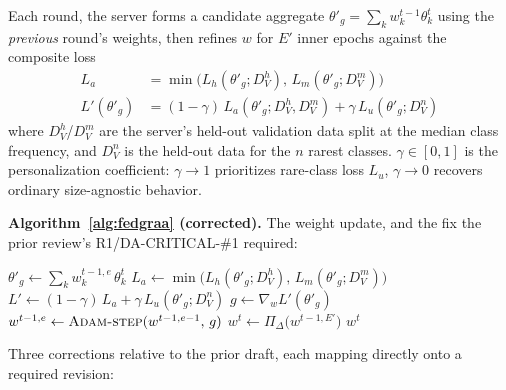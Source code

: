 \documentclass{llncs}
\begin{document}
Each round, the server forms a candidate aggregate $\theta'_g = \sum_k w_k^{t-1} \theta_k^t$ using the \emph{previous} round's weights, then refines $w$ for $E'$ inner epochs against the composite loss
\begin{align}
L_a &= \min\big(L_h(\theta'_g; D_V^h),\, L_m(\theta'_g; D_V^m)\big) \label{eq:la}\\
L'(\theta'_g) &= (1-\gamma)\, L_a(\theta'_g; D_V^h, D_V^m) + \gamma\, L_u(\theta'_g; D_V^n) \label{eq:lprime}
\end{align}
where $D_V^h$/$D_V^m$ are the server's held-out validation data split at the median class frequency, and $D_V^n$ is the held-out data for the $n$ rarest classes. $\gamma \in [0,1]$ is the personalization coefficient: $\gamma \to 1$ prioritizes rare-class loss $L_u$, $\gamma \to 0$ recovers ordinary size-agnostic behavior.

\textbf{Algorithm~\ref{alg:fedgraa} (corrected).} The weight update, and the fix the prior review's R1/DA-CRITICAL-\#1 required:

\begin{algorithm}[htbp]
\caption{FedGRAA weight update, corrected}
\label{alg:fedgraa}
\begin{algorithmic}[1]
    \State $\theta'_g \gets \sum_k w_k^{t-1,e}\, \theta_k^t$
    \State $L_a \gets \min\big(L_h(\theta'_g; D_V^h),\, L_m(\theta'_g; D_V^m)\big)$
    \State $L' \gets (1-\gamma)\, L_a + \gamma\, L_u(\theta'_g; D_V^n)$
    \State $g \gets \nabla_w L'(\theta'_g)$ 
    \State $w^{t-1,e} \gets \Call{Adam-step}{w^{t-1,e-1},\, g}$
  \EndFor
  \State $w^t \gets \Pi_\Delta\big(w^{t-1,E'}\big)$ 
  \State \Return $w^t$
\EndProcedure
\end{algorithmic}
\end{algorithm}

Three corrections relative to the prior draft, each mapping directly onto a required revision:
\end{document}
